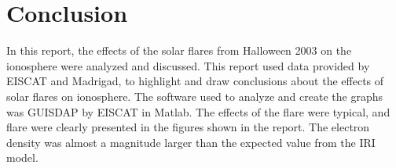 \section{Conclusion}

In this report, the effects of the solar flares from Halloween 2003 on the ionosphere were analyzed and discussed. 
This report used data provided by EISCAT and Madrigad, to highlight and draw conclusions about the effects of solar flares on ionosphere.
The software used to analyze and create the graphs was GUISDAP by EISCAT in Matlab.
The effects of the flare were typical, and flare were clearly presented in the figures shown in the report. The electron density was almost a magnitude larger than the expected value from the IRI model.




